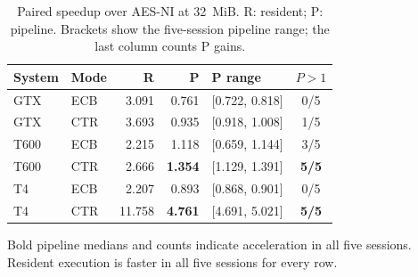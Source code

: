 \begin{table}[htbp]
  \centering
  \small
  \setlength{\tabcolsep}{4pt}
  \caption{Paired speedup over AES-NI at 32~MiB. R: resident; P: pipeline.
  Brackets show the five-session pipeline range; the last column counts P gains.}
  \label{tab:gpu-speedups}
  \begin{tabular}{llrrlc}
    \toprule
    System & Mode & R & P & P range & $P>1$ \\
    \midrule
    GTX & ECB & 3.091 & 0.761 & [0.722, 0.818] & 0/5 \\
    GTX & CTR & 3.693 & 0.935 & [0.918, 1.008] & 1/5 \\
    T600 & ECB & 2.215 & 1.118 & [0.659, 1.144] & 3/5 \\
    T600 & CTR & 2.666 & \textbf{1.354} & [1.129, 1.391] & \textbf{5/5} \\
    T4 & ECB & 2.207 & 0.893 & [0.868, 0.901] & 0/5 \\
    T4 & CTR & 11.758 & \textbf{4.761} & [4.691, 5.021] & \textbf{5/5} \\
    \bottomrule
  \end{tabular}
  \par\smallskip
  \parbox{\linewidth}{\footnotesize Bold pipeline medians and counts indicate
  acceleration in all five sessions. Resident execution is faster in all five sessions
  for every row.}
\end{table}

